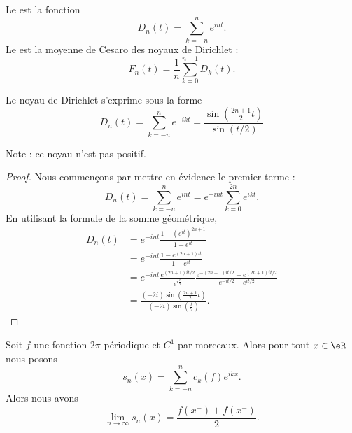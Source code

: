 Le  est la fonction
\begin{equation}
    D_n(t)=\sum_{k=-n}^n e^{int}.
\end{equation}
Le  est la moyenne de Cesaro des noyaux de Dirichlet :
\begin{equation}
    F_n(t)=\frac{1}{ n }\sum_{k=0}^{n-1}D_k(t).
\end{equation}

\begin{lemma}   \label{LemHPoIkwu}
    Le noyau de Dirichlet s'exprime sous la forme
    \begin{equation}    
        D_n(t)=\sum_{k=-n}^n e^{-ikt}=\frac{ \sin\left( \frac{ 2n+1 }{ 2 }t \right) }{ \sin(t/2) }
    \end{equation}
\end{lemma}
Note : ce noyau n'est pas positif.

\begin{proof}
    Nous commençons par mettre en évidence le premier terme :
    \begin{equation}
        D_n(t)=\sum_{k=-n}^n e^{int}= e^{-int}\sum_{k=0}^{2n} e^{ikt}.
    \end{equation}
    En utilisant la formule de la somme géométrique,
    \begin{subequations}
        \begin{align}
            D_n(t)&= e^{-int}\frac{ 1-( e^{it})^{2n+1} }{ 1- e^{it} }\\
            &= e^{-int}\frac{ 1- e^{(2n+1)it} }{ 1- e^{it} }\\
            &= e^{-int}\frac{  e^{(2n+1)it/2} }{  e^{i\frac{ t }{ 2 }} }\frac{  e^{-(2n+1)it/2}- e^{(2n+1)it/2} }{  e^{-it/2}- e^{it/2} }\\
            &=\frac{ (-2i)\sin\left( \frac{ 2n+1 }{ 2 }t \right) }{ (-2i)\sin\left( \frac{ t }{2} \right) }.
        \end{align}
    \end{subequations}
\end{proof}

\begin{theorem}
    Soit \( f\) une fonction \( 2\pi\)-périodique et \( C^1\) par morceaux. Alors pour tout \( x\in \eR\) nous posons
    \begin{equation}
        s_n(x)=\sum_{k=-n}^nc_k(f) e^{ikx}.
    \end{equation}
    Alors nous avons
    \begin{equation}
        \lim_{n\to \infty} s_n(x)=\frac{ f(x^+)+f(x^-) }{ 2 }.
    \end{equation}
\end{theorem}


